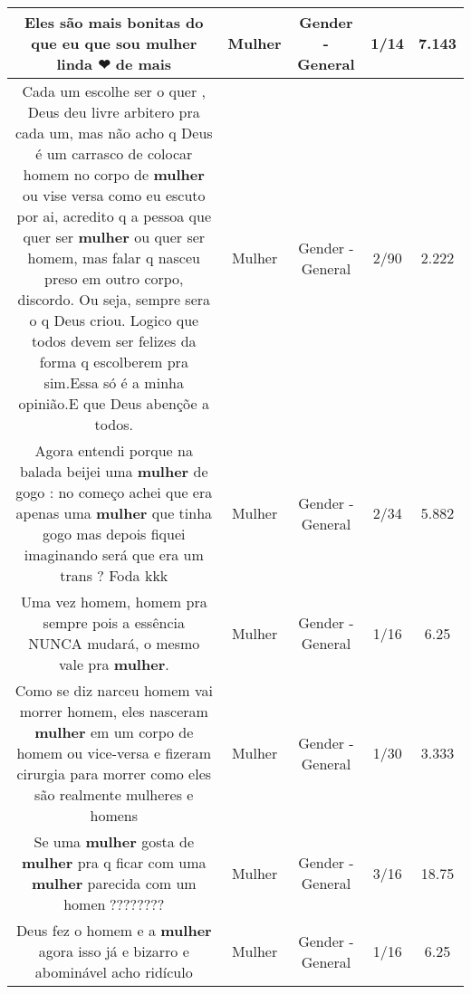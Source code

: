 \documentclass[11pt]{article}
\newlength\mylength
\begin{document}
\begin{center}
\begin{longtable}{|C{.65\mylength}|C{.30\mylength}|C{.12\mylength}|C{.12\mylength}|C{.12\mylength}|}
  \small Eles são mais bonitas do que eu que sou \textbf{mulher}  linda ❤ de mais\normalsize   & Mulher & Gender - General & 1/14 & 7.143 \\  \hline
  \small Cada um escolhe ser o quer , Deus deu livre arbitero pra cada um, mas não acho q Deus é um carrasco de colocar homem no corpo de \textbf{mulher} ou vise versa como eu escuto por ai, acredito q a pessoa que quer ser \textbf{mulher} ou quer ser homem, mas falar q nasceu preso em outro corpo, discordo. Ou seja, sempre sera o q Deus criou. Logico que todos devem ser felizes da forma q escolberem pra sim.Essa só é a minha opinião.E que Deus abençõe a todos.\normalsize   & Mulher & Gender - General & 2/90 & 2.222 \\  \hline
  \small Agora entendi porque na balada beijei uma \textbf{mulher} de gogo : no começo achei que era apenas uma \textbf{mulher} que tinha gogo mas depois fiquei imaginando será que era um trans ? Foda kkk\normalsize   & Mulher & Gender - General & 2/34 & 5.882 \\  \hline
  \small Uma vez homem, homem pra sempre pois a essência NUNCA mudará, o mesmo vale pra \textbf{mulher}.\normalsize   & Mulher & Gender - General & 1/16 & 6.25 \\  \hline
  \small Como se diz narceu homem vai morrer homem, eles nasceram \textbf{mulher} em um corpo de homem ou vice-versa e fizeram cirurgia para morrer como eles são realmente mulheres e homens\normalsize   & Mulher & Gender - General & 1/30 & 3.333 \\  \hline
  \small Se uma \textbf{mulher} gosta de \textbf{mulher} pra q ficar com uma \textbf{mulher} parecida com um homen🤔????????\normalsize   & Mulher & Gender - General & 3/16 & 18.75 \\  \hline
  \small Deus fez o homem e a \textbf{mulher} agora isso já e bizarro e abominável acho ridículo\normalsize   & Mulher & Gender - General & 1/16 & 6.25 \\  \hline

\end{longtable}
\end{center}
\end{document}
